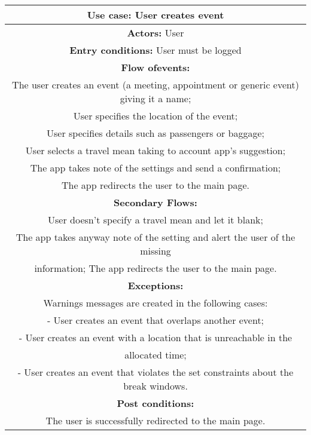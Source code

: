 \documentclass[a4paper]{article}
\begin{document}
\begin{tabular}{|c|}
	
	\hline 
	\textbf{Use case:} User creates event
	\\
	\hline 
	\textbf{Actors:} User
	\\ 
	\hline 
	\textbf{Entry conditions:} User must be logged
	\\ 
	\hline 
	\textbf{Flow ofevents:}
	\\
	The user creates an event (a meeting, appointment or generic event) giving it a name;
	\\
	User specifies the location of the event;
	\\
	User specifies details such as passengers or baggage;
	\\
	User selects a travel mean taking to account app’s suggestion;
	\\
	The app takes note of the settings and send a confirmation;
	\\
	The app redirects the user to the main page.
	
	\\ 
	\hline 
	\textbf{Secondary Flows:}
	\\
	User doesn’t specify a travel mean and let it blank;
	\\
	The app takes anyway note of the setting and alert the user of the missing
	\\
	information;
	The app redirects the user to the main page.
	
	\\ 
	\hline 
	\textbf{Exceptions:}
	\\ Warnings messages are created in the following cases:
	\\
	-	User creates an event that overlaps another event;
	\\
	-	User creates an event with a location that is unreachable in the 
	\\ allocated time;
	\\
	-	User creates an event that violates the set constraints about the break windows.
	
	\\ 
	\hline 
	\textbf{Post conditions:}
	\\
	The user is successfully redirected to the main page.
	\\
	\hline

\end{tabular} 
\end{document}
